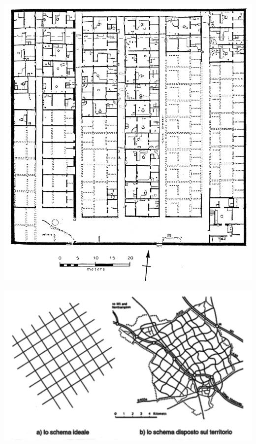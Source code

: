 \documentclass[a4paper,12pt, oneside]{book}
\begin{document}
  \begin{center}
  	\begin{minipage}{0.40\linewidth}
  		\includegraphics[width=\linewidth]{"Immagini/Amarna-WorkersVillage-U-90"}
  		\label{fig:Amarna-WorkersVillage-U-90}
  	\end{minipage}%
  	\hfill
  	\begin{minipage}{0.42\linewidth}
  		\includegraphics[width=\linewidth]{"Immagini/maglia rettangolare"}
  		\label{fig:maglia rettangolare}
  	\end{minipage}
  \end{center}
\end{document}
